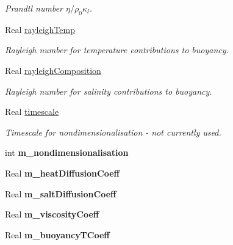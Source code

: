 \begin{DoxyCompactItemize}
\begin{DoxyCompactList}\small\item\em Prandtl number $ \eta / \rho_0 \kappa_l $. \end{DoxyCompactList}\item 
Real \hyperlink{class_mushy_layer_params_ada4f0f588513e96f72dcb1ba35a2585f}{rayleigh\-Temp}
\begin{DoxyCompactList}\small\item\em Rayleigh number for temperature contributions to buoyancy. \end{DoxyCompactList}\item 
Real \hyperlink{class_mushy_layer_params_a7caaf9bff2bf7525386717144ecb7118}{rayleigh\-Composition}
\begin{DoxyCompactList}\small\item\em Rayleigh number for salinity contributions to buoyancy. \end{DoxyCompactList}\item 
Real \hyperlink{class_mushy_layer_params_a77c66c8908da36411b789c07dd412eca}{timescale}
\begin{DoxyCompactList}\small\item\em Timescale for nondimensionalisation -\/ not currently used. \end{DoxyCompactList}\item 
\hypertarget{class_mushy_layer_params_aa9567ee5806f9aa8619a760da3574ba4}{int {\bfseries m\-\_\-nondimensionalisation}}\label{class_mushy_layer_params_aa9567ee5806f9aa8619a760da3574ba4}

\item 
\hypertarget{class_mushy_layer_params_a6c0e412490392930b9e23bc271fa6538}{Real {\bfseries m\-\_\-heat\-Diffusion\-Coeff}}\label{class_mushy_layer_params_a6c0e412490392930b9e23bc271fa6538}

\item 
\hypertarget{class_mushy_layer_params_a797b35fc1db221bff72743474c7a89a8}{Real {\bfseries m\-\_\-salt\-Diffusion\-Coeff}}\label{class_mushy_layer_params_a797b35fc1db221bff72743474c7a89a8}

\item 
\hypertarget{class_mushy_layer_params_a739fe4d09f2dc6d3af092275bf74af9d}{Real {\bfseries m\-\_\-viscosity\-Coeff}}\label{class_mushy_layer_params_a739fe4d09f2dc6d3af092275bf74af9d}

\item 
\hypertarget{class_mushy_layer_params_a750c29a32b8ca88dd3c62fe093ec2760}{Real {\bfseries m\-\_\-buoyancy\-T\-Coeff}}\label{class_mushy_layer_params_a750c29a32b8ca88dd3c62fe093ec2760}


\end{DoxyCompactItemize}
